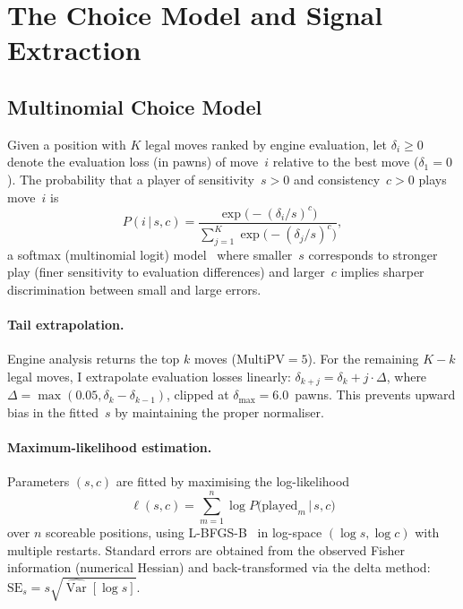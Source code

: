 \documentclass[11pt,a4paper]{article}
\DeclareMathOperator{\Var}{Var}
\newcommand{\given}{\,|\,}
\theoremstyle{definition}
\begin{document}
\section{The Choice Model and Signal Extraction}
\label{sec:model}

\subsection{Multinomial Choice Model}
\label{sec:choice}

Given a position with $K$ legal moves ranked by engine evaluation, let
$\delta_i \ge 0$ denote the evaluation loss (in pawns) of move~$i$
relative to the best move ($\delta_1 = 0$).  The probability that a
player of sensitivity~$s > 0$ and consistency~$c > 0$ plays move~$i$ is
\begin{equation}
  \label{eq:choice}
  P(i \given s, c)
  = \frac{\exp\!\bigl(-(\delta_i / s)^c\bigr)}
         {\sum_{j=1}^{K} \exp\!\bigl(-(\delta_j / s)^c\bigr)},
\end{equation}
a softmax (multinomial logit) model~\citep{regan2011understanding}
where smaller~$s$ corresponds to stronger play (finer sensitivity to
evaluation differences) and larger~$c$ implies sharper discrimination
between small and large errors.

\paragraph{Tail extrapolation.}
Engine analysis returns the top $k$ moves (MultiPV${}=5$).  For the
remaining $K - k$ legal moves, I extrapolate evaluation losses
linearly: $\delta_{k+j} = \delta_k + j \cdot \Delta$, where
$\Delta = \max(0.05, \delta_k - \delta_{k-1})$, clipped at
$\delta_{\max} = 6.0$~pawns.  This prevents upward bias in the fitted~$s$
by maintaining the proper normaliser.

\paragraph{Maximum-likelihood estimation.}
Parameters $(s, c)$ are fitted by maximising the log-likelihood
\begin{equation}
  \label{eq:loglik}
  \ell(s,c) = \sum_{m=1}^{n} \log P\bigl(\text{played}_m \given s, c\bigr)
\end{equation}
over $n$ scoreable positions, using L-BFGS-B~\citep{byrd1995limited} in log-space
$(\log s, \log c)$ with multiple restarts.  Standard errors are obtained
from the observed Fisher information (numerical Hessian) and
back-transformed via the delta method:
$\mathrm{SE}_s = s \sqrt{\widehat{\Var}[\log s]}$.
\end{document}
